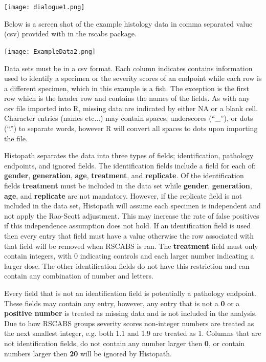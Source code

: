 \documentclass[a4paper]{article}
\begin{document}
\begin{center}
\texttt{[image: dialogue1.png]}
\end{center} 
\par
Below is a screen shot of the example histology data in comma separated value (csv) provided with in the rscabs package.  

\hypertarget{fig:Data}{}
\begin{center}
\texttt{[image: ExampleData2.png]}
\end{center} 


\par
Data sets must be in a csv format.  Each column indicates contains information used to identify a specimen or the severity scores of an endpoint while each row is a different specimen, which 
in this example is a fish. The exception is the first row which is the header row and contains the names of the fields.  
As with any csv file imported into R, missing data are indicated by either NA or a blank cell.  
Character entries (names etc...) may contain spaces, underscores (``\_''), or dots (``.'') to separate words, however R will convert all spaces to dots 
upon importing the file.  
\par
 Histopath separates the data into three types of fields; identification, pathology endpoints, and ignored fields.  
 The identification fields include a field for each of: \textbf{gender}, \textbf{generation},  \textbf{age},  \textbf{treatment}, and  
 \textbf{replicate}.  Of the identification fields \textbf{treatment} must be included in the data set while \textbf{gender}, \textbf{generation},  
 \textbf{age}, and \textbf{replicate} are not mandatory. However, if the replicate field is not included in the data set, Histopath will assume each specimen is 
 independent and not apply the Rao-Scott adjustment.  
 This may increase the rate of false positives if this independence assumption does not hold.  
 If an identification field is used then every entry that field must have a value otherwise the row associated with that field will be removed when RSCABS is ran. 
 The \textbf{treatment} field must only contain integers, with 0 indicating controls and each larger number indicating a larger dose.  
 The other identification fields do not have this restriction and can contain any combination of number and letters. 

 
 \par
 	Every field that is not an identification field is potentially a pathology endpoint.  
	These fields may contain any entry, however, any entry that is not a \textbf{0} or a \textbf{positive number} 
	is treated as missing data and is not included in the analysis. 
	Due to how RSCABS groups severity scores non-integer numbers are treated as the next smallest integer, e.g. both 1.1 and 1.9 are treated as 1. 
	Columns that are not identification fields, do not contain any number larger then \textbf{0}, or contain numbers larger then \textbf{20} will be ignored by Histopath.   	
  \par
  
\end{document}
